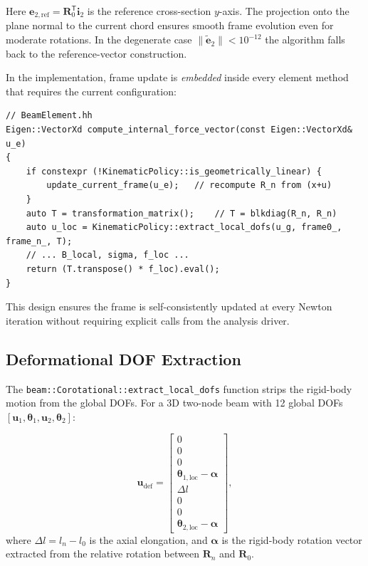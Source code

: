 Here $\mathbf{e}_{2,\mathrm{ref}} = \mathbf{R}_0^{\mathsf{T}} \mathbf{i}_2$ is
the reference cross-section $y$-axis.  The projection onto the plane
normal to the current chord ensures smooth frame evolution even for
moderate rotations.  In the degenerate case
$\lVert\tilde{\mathbf{e}}_2\rVert < 10^{-12}$ the algorithm falls back to
the reference-vector construction.

In the implementation, frame update is \emph{embedded} inside every
element method that requires the current configuration:
\begin{lstlisting}
// BeamElement.hh
Eigen::VectorXd compute_internal_force_vector(const Eigen::VectorXd& u_e)
{
    if constexpr (!KinematicPolicy::is_geometrically_linear) {
        update_current_frame(u_e);   // recompute R_n from (x+u)
    }
    auto T = transformation_matrix();    // T = blkdiag(R_n, R_n)
    auto u_loc = KinematicPolicy::extract_local_dofs(u_g, frame0_, frame_n_, T);
    // ... B_local, sigma, f_loc ...
    return (T.transpose() * f_loc).eval();
}
\end{lstlisting}
This design ensures the frame is self-consistently updated at every Newton
iteration without requiring explicit calls from the analysis driver.

\subsection{Deformational DOF Extraction}

The \texttt{beam::Corotational::extract\_local\_dofs} function strips the
rigid-body motion from the global DOFs.  For a 3D two-node beam with 12
global DOFs $[\mathbf{u}_1,\bm{\theta}_1,\mathbf{u}_2,\bm{\theta}_2]$:

\begin{equation}\label{eq:deformational-dofs}
  \mathbf{u}_\mathrm{def} =
  \begin{bmatrix}
    0 \\ 0 \\ 0 \\
    \bm{\theta}_{1,\mathrm{loc}} - \bm{\alpha} \\
    \Delta l \\ 0 \\ 0 \\
    \bm{\theta}_{2,\mathrm{loc}} - \bm{\alpha}
  \end{bmatrix},
\end{equation}
where $\Delta l = l_n - l_0$ is the axial elongation, and
$\bm{\alpha}$ is the rigid-body rotation vector extracted from the
relative rotation between $\mathbf{R}_n$ and
$\mathbf{R}_0$.

